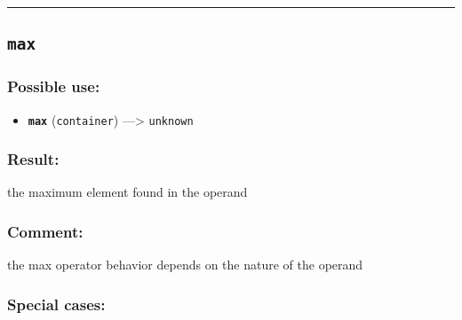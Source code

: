 \documentclass[]{book}
\providecommand{\tightlist}{%
  \setlength{\itemsep}{0pt}\setlength{\parskip}{0pt}}
\theoremstyle{definition}
\theoremstyle{definition}
\theoremstyle{definition}
\theoremstyle{remark}
\begin{document}
\begin{center}\rule{0.5\linewidth}{\linethickness}\end{center}

\subsection{\texorpdfstring{\texttt{max}}{max}}\label{max}

\subsubsection{Possible use:}\label{possible-use-339}

\begin{itemize}
\tightlist
\item
  \textbf{\texttt{max}} (\texttt{container}) ---\textgreater{}
  \texttt{unknown}
\end{itemize}

\subsubsection{Result:}\label{result-328}

the maximum element found in the operand

\subsubsection{Comment:}\label{comment-65}

the max operator behavior depends on the nature of the operand

\subsubsection{Special cases:}\label{special-cases-93}
\end{document}
